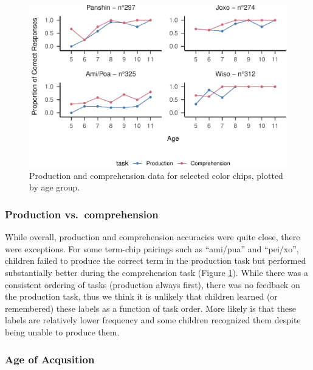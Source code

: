\documentclass[
  english,
  ,man,floatsintext]{apa6}
\begin{document}
\begin{figure}
\centering
\includegraphics{amazon_color_files/figure-latex/study2-task-compare-plot-1.pdf}
\caption{\label{fig:study2-task-compare-plot}Production and comprehension data for selected color chips, plotted by age group.}
\end{figure}

\hypertarget{production-vs.-comprehension}{%
\subsubsection{Production vs.~comprehension}\label{production-vs.-comprehension}}

While overall, production and comprehension accuracies were quite close, there were exceptions. For some term-chip pairings such as \enquote{ami/pua} and \enquote{pei/xo}, children failed to produce the correct term in the production task but performed substantially better during the comprehension task (Figure \ref{fig:study2-task-compare-plot}). While there was a consistent ordering of tasks (production always first), there was no feedback on the production task, thus we think it is unlikely that children learned (or remembered) these labels as a function of task order. More likely is that these labels are relatively lower frequency and some children recognized them despite being unable to produce them.

\hypertarget{age-of-acqusition}{%
\subsubsection{Age of Acqusition}\label{age-of-acqusition}}
\end{document}
